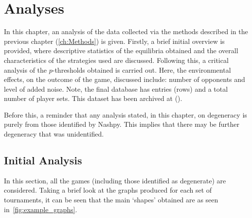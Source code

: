 \chapter{Analyses}\label{ch:Analysis}
In this chapter, an analysis of the data collected via the methods described in
the previous chapter (\autoref{ch:Methods}) is given. Firstly, a brief
initial overview is provided, where descriptive statistics of the equilibria
obtained and the overall characteristics of the strategies used are discussed.
Following this, a critical analysis of the \(p\)-thresholds obtained is carried
out. Here, the environmental effects, on the outcome of the game, discussed
include: number of opponents and level of added noise. Note, the final database
has
 entries (rows) and a total number of 
 player
sets. This dataset has been archived at ().

Before this, a reminder that any analysis stated, in this chapter, on degeneracy
is purely from those identified by Nashpy. This implies that there may be
further degeneracy that was unidentified.

\section{Initial Analysis}\label{sec:Initial_Analysis}
In this section, all the games (including those identified as degenerate)
are considered. Taking a brief look at the graphs produced for each set of
tournaments, it can be seen that the main `shapes' obtained are as seen in~\autoref{fig:example_graphs}.

